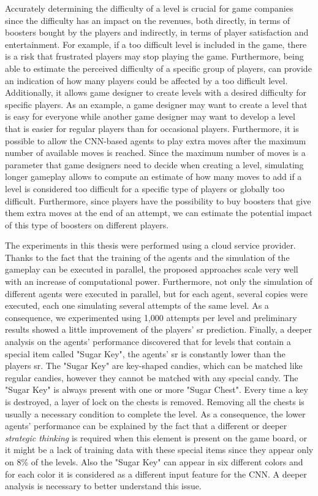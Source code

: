 Accurately determining the difficulty of a level is crucial for game companies since the difficulty has an impact on the revenues, both directly, in terms of boosters bought by the players and indirectly, in terms of player satisfaction and entertainment. For example, if a too difficult level is included in the game, there is a risk that frustrated players may stop playing the game. Furthermore, being able to estimate the perceived difficulty of a specific group of players, can provide an indication of how many players could be affected by a too difficult level. Additionally, it allows game designer to create levels with a desired difficulty for specific players. As an example, a game designer may want to create a level that is easy for everyone while another game designer may want to develop a level that is easier for regular players than for occasional players. 
Furthermore, it is possible to allow the \acs{CNN}-based agents to play extra moves after the maximum number of available moves is reached. Since the maximum number of moves is a parameter that game designers need to decide when creating a level, simulating longer gameplay allows to compute an estimate of how many moves to add if a level is considered too difficult for a specific type of players or globally too difficult. Furthermore, since players have the possibility to buy boosters that give them extra moves at the end of an attempt, we can estimate the potential impact of this type of boosters on different players. 

The experiments in this thesis were performed using a cloud service provider. Thanks to the fact that the training of the agents and the simulation of the gameplay can be executed in parallel, the proposed approaches scale very well with an increase of computational power. Furthermore, not only the simulation of different agents were executed in parallel, but for each agent, several copies were executed, each one simulating several attempts of the same level. As a consequence, we experimented using 1,000 attempts per level and preliminary results showed a little improvement of the players' \acs{sr} prediction.
Finally, a deeper analysis on the agents' performance discovered that for levels that contain a special item called "Sugar Key", the agents' \acs{sr} is constantly lower than the players \acs{sr}. The "Sugar Key" are key-shaped candies, which can be matched like regular candies, however they cannot be matched with any special candy. The "Sugar Key" is always present with one or more "Sugar Chest". Every time a key is destroyed, a layer of lock on the chests is removed. Removing all the chests is usually a necessary condition to complete the level. As a consequence, the lower agents' performance can be explained by the fact that a different or deeper \textit{strategic thinking} is required when this element is present on the game board, or it might be a lack of training data with these special items since they appear only on 8\% of the levels. Also the "Sugar Key" can appear in six different colors and for each color it is considered as a different input feature for the \acs{CNN}. A deeper analysis is necessary to better understand this issue.

